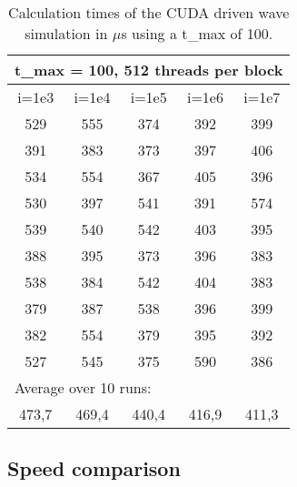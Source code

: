 \documentclass[a4paper]{article}
\begin{document}
		\begin{table}[H]
			\label{table:i_change_100}
			\caption{Calculation times of the CUDA driven wave simulation in $\mu$s using a t\_max of 100.}
			\begin{center}
				\begin{tabular}{| c | c | c | c | c |}
					\hline
					\multicolumn{5}{|l|}{t\_max = 100, 512 threads per block}\\
					\hline
					i=1e3 & i=1e4 & i=1e5 & i=1e6 & i=1e7\\ 
					\hline
					529 & 555 & 374 & 392 & 399\\ 
					\hline
					391 & 383 & 373 & 397 & 406\\ 
					\hline
					534 & 554 & 367 & 405 & 396\\ 
					\hline
					530 & 397 & 541 & 391 & 574\\ 
					\hline
					539 & 540 & 542 & 403 & 395\\ 
					\hline
					388 & 395 & 373 & 396 & 383\\ 
					\hline
					538 & 384 & 542 & 404 & 383\\ 
					\hline
					379 & 387 & 538 & 396 & 399\\ 
					\hline
					382 & 554 & 379 & 395 & 392\\ 
					\hline
					527 & 545 & 375 & 590 & 386\\ 
					\hline
					\multicolumn{5}{|l|}{Average over 10 runs:}\\
					\hline
					473,7 & 469,4 & 440,4 & 416,9 & 411,3\\ 
					\hline
				\end{tabular}
			\end{center}
		\end{table}
		
	\subsection{Speed comparison}
	
\end{document}
